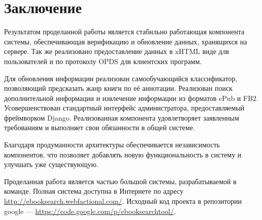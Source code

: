\section{Заключение}

Результатом проделанной работы является стабильно работающая компонента системы, обеспечивающая верификацию и обновление данных, хранящихся на сервере. Так же реализовано предоставление данных в xHTML виде для пользователей и по протоколу OPDS для клиентских программ. 

Для обновления информации реализован самообучающийся классификатор, позволяющий предсказать жанр книги по её аннотации. Реализован поиск дополнительной информации и извлечение информации из форматов ePub и FB2. Усовершенствован стандартный интерфейс администратора, пре\-доставляемый фреймворком Django. Реализованная компонента удовлетворяет заявленным требованиям и выполняет свои обязанности в общей системе. 

Благодаря продуманности архитектуры обеспечивается независимость \\компонентов, что позволяет добавлять новую функциональность в систему и улучшать уже существующую.

Проделанная работа является частью большой системы, разрабатываемой в команде. Полная система доступна в Интернете по адресу\\ \url{http://ebooksearch.webfactional.com/}. Исходный код проекта в репозитории google --- \url{https://code.google.com/p/ebooksearchtool/}.
	
\newpage